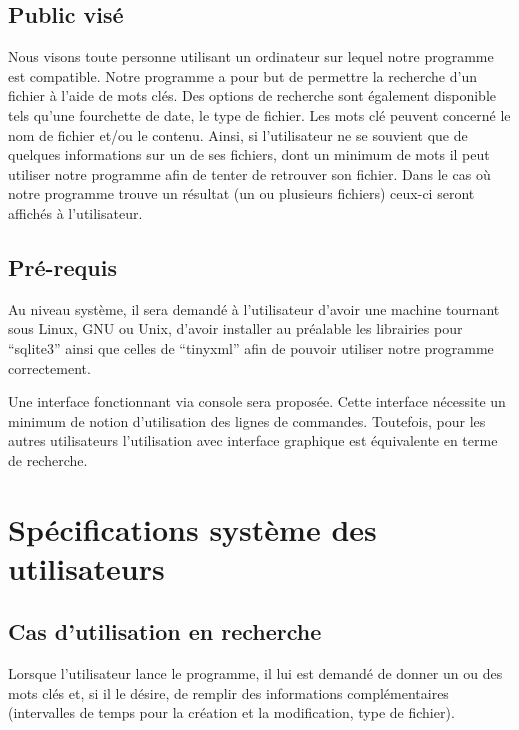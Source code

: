 \documentclass[a4paper,12pt]{report}
\begin{document}
\subsection{Public visé}
Nous visons toute personne utilisant un ordinateur sur lequel notre programme est compatible. Notre programme a pour but de permettre la recherche d'un \gls{fichier} à l'aide de mots clés. Des options de recherche sont également disponible tels qu'une fourchette de date, le type de \gls{fichier}. Les mots clé peuvent concerné le nom de \gls{fichier} et/ou le contenu. Ainsi, si l'utilisateur ne se souvient que de quelques informations sur un de ses \glspl{fichier}, dont un minimum de mots il peut utiliser notre programme afin de tenter de retrouver son \gls{fichier}. Dans le cas où notre programme trouve un résultat (un ou plusieurs \glspl{fichier}) ceux-ci seront affichés à l'utilisateur.

\subsection{Pré-requis}
Au niveau système, il sera demandé à l'utilisateur d'avoir une machine tournant sous Linux, GNU ou Unix, d'avoir installer au préalable les librairies pour \enquote{sqlite3} ainsi que celles de \enquote{tinyxml} afin de pouvoir utiliser notre programme correctement.

Une interface fonctionnant via \gls{console} sera proposée. Cette interface nécessite un minimum de notion d'utilisation des lignes de commandes. Toutefois, pour les autres utilisateurs l'utilisation avec interface graphique est équivalente en terme de recherche.

\section{Spécifications système des utilisateurs}

\subsection{Cas d'utilisation en recherche}
Lorsque l'utilisateur lance le programme, il lui est demandé de donner un ou des mots clés et, si il le désire, de remplir des informations complémentaires (intervalles de temps pour la création et la modification, type de \gls{fichier}).
\end{document}
